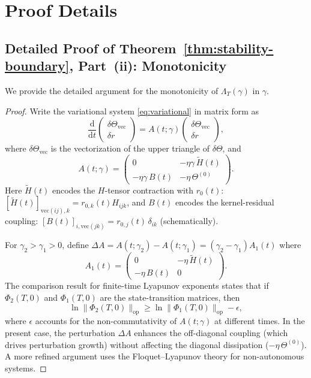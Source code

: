 \documentclass[11pt]{article}
\theoremstyle{definition}
\newcommand{\norm}[1]{\lVert #1 \rVert}
\newcommand{\dd}{\mathrm{d}}
\renewcommand{\Theta}{\varTheta}
\begin{document}
\appendix

\section{Proof Details}
\label{app:proofs}

\subsection{Detailed Proof of Theorem~\ref{thm:stability-boundary}, Part~(ii): Monotonicity}

We provide the detailed argument for the monotonicity of $\Lambda_T(\gamma)$ in $\gamma$.

\begin{proof}
Write the variational system \eqref{eq:variational} in matrix form as
\begin{equation}
\frac{\dd}{\dd t}\begin{pmatrix} \delta\Theta_{\mathrm{vec}} \\ \delta r \end{pmatrix} = A(t;\gamma) \begin{pmatrix} \delta\Theta_{\mathrm{vec}} \\ \delta r \end{pmatrix},
\end{equation}
where $\delta\Theta_{\mathrm{vec}}$ is the vectorization of the upper triangle of $\delta\Theta$, and
\begin{equation}
A(t;\gamma) = \begin{pmatrix} 0 & -\eta\gamma\, \tilde{H}(t) \\ -\eta\gamma\, B(t) & -\eta\,\Theta^{(0)} \end{pmatrix}.
\end{equation}
Here $\tilde{H}(t)$ encodes the $H$-tensor contraction with $r_0(t)$: $[\tilde{H}(t)]_{\mathrm{vec}(ij),k} = r_{0,k}(t) H_{ijk}$, and $B(t)$ encodes the kernel-residual coupling: $[B(t)]_{i,\mathrm{vec}(jk)} = r_{0,j}(t)\,\delta_{ik}$ (schematically).

For $\gamma_2 > \gamma_1 > 0$, define $\Delta A = A(t;\gamma_2) - A(t;\gamma_1) = (\gamma_2 - \gamma_1) A_1(t)$ where
\begin{equation}
A_1(t) = \begin{pmatrix} 0 & -\eta\,\tilde{H}(t) \\ -\eta\,B(t) & 0 \end{pmatrix}.
\end{equation}
The comparison result for finite-time Lyapunov exponents states that if $\Phi_2(T,0)$ and $\Phi_1(T,0)$ are the state-transition matrices, then
\begin{equation}
\ln\norm{\Phi_2(T,0)}_{\mathrm{op}} \ge \ln\norm{\Phi_1(T,0)}_{\mathrm{op}} - \epsilon,
\end{equation}
where $\epsilon$ accounts for the non-commutativity of $A(t;\gamma)$ at different times. In the present case, the perturbation $\Delta A$ enhances the off-diagonal coupling (which drives perturbation growth) without affecting the diagonal dissipation ($-\eta\,\Theta^{(0)}$). A more refined argument uses the Floquet--Lyapunov theory for non-autonomous systems.


\end{proof}
\end{document}
